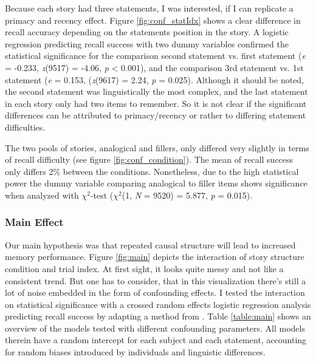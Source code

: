 \documentclass[a4paper,man,natbib,floatsintext,import]{apa6}
\begin{document}
Because each story had three statements, I was interested, if I can replicate a primacy and recency effect. Figure \ref{fig:conf_statIdx} shows a clear difference in recall accuracy depending on the statements position in the story. A logistic regression predicting recall success with two dummy variables confirmed the statistical significance for the comparison second statement vs. first statement (\textit{e} = -0.233, \textit{z}(9517) = -4.06, \textit{p} < 0.001), and the comparison 3rd statement vs. 1st statement (\textit{e} = 0.153, (\textit{z}(9617) = 2.24, \textit{p} = 0.025). Although it should be noted, the second statement was linguistically the most complex, and the last statement in each story only had two items to remember. So it is not clear if the significant differences can be attributed to primacy/recency or rather to differing statement difficulties.

The two pools of stories, analogical and fillers, only differed very slightly in terms of recall difficulty (see figure \ref{fig:conf_condition}). The mean of recall success only differs 2\% between the conditions. Nonetheless, due to the high statistical power the dummy variable comparing analogical to filler items shows significance when analyzed with ${\chi}^2$-test (\textit{${\chi}^2$}(1, \textit{N} = 9520) = 5.877, \textit{p} = 0.015).

\subsubsection{Main Effect}
Our main hypothesis was that repeated causal structure will lead to increased memory performance. Figure \ref{fig:main} depicts the interaction of story structure condition and trial index. At first sight, it looks quite messy and not like a consistent trend. But one has to consider, that in this visualization there's still a lot of noise embedded in the form of confounding effects. I tested the interaction on statistical significance with a crossed random effects logistic regression analysis predicting recall success by adapting a method from \cite{Baayen2008}. Table \ref{table:main} shows an overview of the models tested with different confounding parameters. All models therein have a random intercept for each subject and each statement, accounting for random biases introduced by individuals and linguistic differences.
\end{document}
